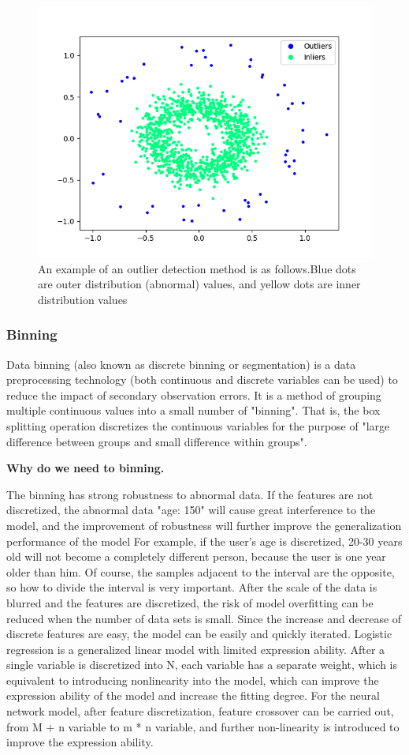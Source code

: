 \begin{figure}[ht]
    \centering
    \includegraphics[width=0.7\linewidth]{images/outliers.png}
    \caption{An example of an outlier detection method is as follows.Blue dots are outer distribution (abnormal) values, and yellow dots are inner distribution values}
    \label{fig:outliers}
\end{figure}

\subsubsection{Binning}
Data binning (also known as discrete binning or segmentation) is a data preprocessing technology (both continuous and discrete variables can be used) to reduce the impact of secondary observation errors. It is a method of grouping multiple continuous values into a small number of "binning". That is, the box splitting operation discretizes the continuous variables for the purpose of "large difference between groups and small difference within groups".

\textbf{Why do we need to binning.} 

The binning has strong robustness to abnormal data. If the features are not discretized, the abnormal data "age: 150" will cause great interference to the model, and the improvement of robustness will further improve the generalization performance of the model
For example, if the user's age is discretized, 20-30 years old will not become a completely different person, because the user is one year older than him. Of course, the samples adjacent to the interval are the opposite, so how to divide the interval is very important. After the scale of the data is blurred and the features are discretized, the risk of model overfitting can be reduced when the number of data sets is small. Since the increase and decrease of discrete features are easy, the model can be easily and quickly iterated.
Logistic regression is a generalized linear model with limited expression ability. After a single variable is discretized into N, each variable has a separate weight, which is equivalent to introducing nonlinearity into the model, which can improve the expression ability of the model and increase the fitting degree. For the neural network model, after feature discretization, feature crossover can be carried out, from M + n variable to m * n variable, and further non-linearity is introduced to improve the expression ability.

